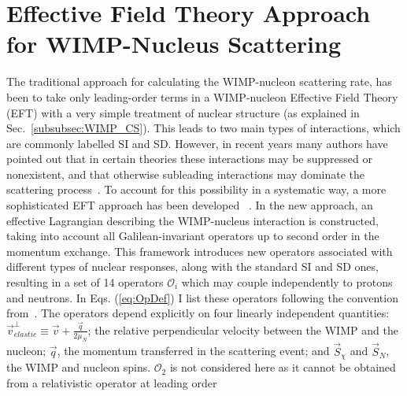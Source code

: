 \section{Effective Field Theory Approach for WIMP-Nucleus Scattering}
\label{sec:intro_EFT}

The traditional approach for calculating the WIMP-nucleon scattering rate, has been to take only leading-order terms in a WIMP-nucleon Effective Field Theory (EFT) with a very simple treatment of nuclear structure (as explained in Sec.~\ref{subsubsec:WIMP_CS}). This leads to two main types of interactions, which are commonly labelled SI and SD. However, in recent years many authors have pointed out that in certain theories these interactions may be suppressed or nonexistent, and that otherwise subleading interactions may dominate the scattering process~\cite{Chang:2009yt}. To account for this possibility in a systematic way, a more sophisticated EFT approach has been developed ~\cite{Fitzpatrick:2012ib,Anand:MathTools,Fitzpatrick:MathTools}. In the new approach, an effective Lagrangian describing the WIMP-nucleus interaction is constructed, taking into account all Galilean-invariant operators up to second order in the momentum exchange. This framework introduces new operators associated with different types of nuclear responses, along with the standard SI and SD ones, resulting in a set of 14 operators $\mathcal{O}_i$ which may couple independently to protons and neutrons. In Eqs. (\ref{eq:OpDef}) I list these operators following the convention from~\cite{Anand:MathTools}. The operators depend explicitly on four linearly independent quantities: $\vec{v}_{elastic}^{\perp} \equiv \vec{v} + \frac{\vec{q}}{2\mu_N} $; the relative perpendicular velocity between the WIMP and the nucleon; $\vec{q}$, the momentum transferred in the scattering event; and $\vec{S}_\chi$ and $\vec{S}_N$, the WIMP and nucleon spins. $\mathcal{O}_2$ is not considered here as it cannot be obtained from a relativistic operator at leading order
%

